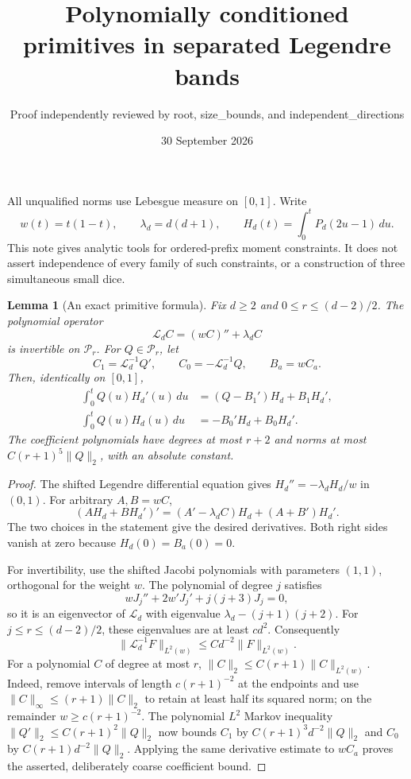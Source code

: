 \documentclass[11pt]{article}
\title{Polynomially conditioned primitives in separated Legendre bands}
\author{Proof independently reviewed by root, size\_bounds, and independent\_directions}
\date{30 September 2026}
\newtheorem{lemma}{Lemma}
\newcommand{\PP}{\mathcal P}
\begin{document}
\maketitle
All unqualified norms use Lebesgue measure on $[0,1]$. Write
\[
 w(t)=t(1-t),\qquad \lambda_d=d(d+1),\qquad
 H_d(t)=\int_0^tP_d(2u-1)\,du.
\]
This note gives analytic tools for ordered-prefix moment constraints.
It does not assert independence of every family of such constraints,
or a construction of three simultaneous small dice.

\begin{lemma}[An exact primitive formula]\label{primitive}
Fix $d\ge2$ and $0\le r\le(d-2)/2$. The polynomial operator
\[
 \mathcal L_d C=(wC)''+\lambda_d C
\]
is invertible on $\PP_r$. For $Q\in\PP_r$, let
\[
 C_1=\mathcal L_d^{-1}Q',\qquad C_0=-\mathcal L_d^{-1}Q,
 \qquad B_a=w C_a.
\]
Then, identically on $[0,1]$,
\begin{align}
 \int_0^tQ(u)H_d'(u)\,du
   &=(Q-B_1')H_d+B_1H_d',\label{prim1}\\
 \int_0^tQ(u)H_d(u)\,du
   &=-B_0'H_d+B_0H_d'.\label{prim0}
\end{align}
The coefficient polynomials have degrees at most $r+2$ and norms
at most $C(r+1)^5\|Q\|_2$, with an absolute constant.
\end{lemma}
\begin{proof}
The shifted Legendre differential equation gives
$H_d''=-\lambda_d H_d/w$ in $(0,1)$.
For arbitrary $A,B=wC$,
\[
 (AH_d+BH_d')'=(A'-\lambda_d C)H_d+(A+B')H_d'.
\]
The two choices in the statement give the desired derivatives.
Both right sides vanish at zero because $H_d(0)=B_a(0)=0$.

For invertibility, use the shifted Jacobi polynomials with parameters
$(1,1)$, orthogonal for the weight $w$. The polynomial of degree $j$
satisfies
\[
 wJ_j''+2w'J_j'+j(j+3)J_j=0,
\]
so it is an eigenvector of $\mathcal L_d$ with eigenvalue
$\lambda_d-(j+1)(j+2)$. For $j\le r\le(d-2)/2$, these eigenvalues
are at least $c d^2$. Consequently
\[
 \|\mathcal L_d^{-1}F\|_{L^2(w)}\le C d^{-2}\|F\|_{L^2(w)}.
\]
For a polynomial $C$ of degree at most $r$,
$\|C\|_2\le C(r+1)\|C\|_{L^2(w)}$. Indeed, remove intervals
of length $c(r+1)^{-2}$ at the endpoints and use
$\|C\|_\infty\le(r+1)\|C\|_2$ to retain at least half its squared
norm; on the remainder $w\ge c(r+1)^{-2}$.
The polynomial $L^2$ Markov inequality
$\|Q'\|_2\le C(r+1)^2\|Q\|_2$ now bounds $C_1$ by
$C(r+1)^3d^{-2}\|Q\|_2$ and $C_0$ by
$C(r+1)d^{-2}\|Q\|_2$. Applying the same derivative estimate to
$wC_a$ proves the asserted, deliberately coarse coefficient bound.
\end{proof}
\end{document}
